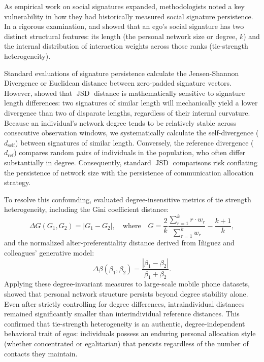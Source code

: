 \documentclass[11pt,letterpaper]{article}
\newcommand{\JSD}{\operatorname{JSD}}
\newcommand{\dself}{d_{\mathrm{self}}}
\newcommand{\dref}{d_{\mathrm{ref}}}
\begin{document}
As empirical work on social signatures expanded, methodologists noted a key vulnerability in how they had historically measured social signature persistence. In a rigorous examination, \citet{heydari2024disentangling} and \citet{heydari2024dynamic} showed that an ego's social signature has two distinct structural features: its length (the personal network size or degree, $k$) and the internal distribution of interaction weights across those ranks (tie-strength heterogeneity).

Standard evaluations of signature persistence calculate the Jensen-Shannon Divergence or Euclidean distance between zero-padded signature vectors. However, \citet{heydari2024disentangling} showed that $\JSD$ distance is mathematically sensitive to signature length differences: two signatures of similar length will mechanically yield a lower divergence than two of disparate lengths, regardless of their internal curvature. Because an individual's network degree tends to be relatively stable across consecutive observation windows, we systematically calculate the self-divergence ($\dself$) between signatures of similar length. Conversely, the reference divergence ($\dref$) compares random pairs of individuals in the population, who often differ substantially in degree. Consequently, standard $\JSD$ comparisons risk conflating the persistence of network size with the persistence of communication allocation strategy.

To resolve this confounding, \citet{heydari2024disentangling} evaluated degree-insensitive metrics of tie strength heterogeneity, including the Gini coefficient distance:
\begin{equation}
    \Delta G(G_1, G_2) = |G_1 - G_2|, \quad \text{where} \quad G = \frac{2}{k} \frac{\sum_{r=1}^k r \cdot w_r}{\sum_{r=1}^k w_r} - \frac{k+1}{k},
    \label{eq:gini_dist}
\end{equation}
and the normalized alter-preferentiality distance derived from I{\~n}iguez and colleagues' generative model:
\begin{equation}
    \Delta \beta(\beta_1, \beta_2) = \frac{|\beta_1 - \beta_2|}{\beta_1 + \beta_2}.
    \label{eq:beta_dist}
\end{equation}
Applying these degree-invariant measures to large-scale mobile phone datasets, \citet{heydari2024disentangling} showed that personal network structure persists beyond degree stability alone. Even after strictly controlling for degree differences, intraindividual distances remained significantly smaller than interindividual reference distances. This confirmed that tie-strength heterogeneity is an authentic, degree-independent behavioral trait of egos: individuals possess an enduring personal allocation style (whether concentrated or egalitarian) that persists regardless of the number of contacts they maintain.
\end{document}
